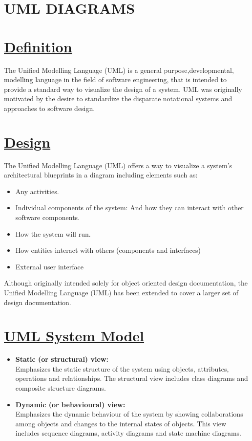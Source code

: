 \documentclass[12pt]{extreport}
\begin{document}
\section{UML DIAGRAMS}

\section*{\underline{Definition}}
\hspace*{5em}The Unified Modelling Language (UML) is a general purpose,developmental, modelling language in the field of software
engineering, that is intended to provide a standard way to visualize the design of a system. UML was originally motivated by the desire to standardize the disparate notational systems and approaches to software design.


\section*{\underline{Design}}
The Unified Modelling Language (UML) offers a way to visualize a system's architectural blueprints in a diagram  including elements such as:
\begin{itemize}


\item Any activities.
\item Individual components of the system:
And how they can interact with other software components.
\item How the system will run.
\item How entities interact with others (components and interfaces)
\item External user interface
\end{itemize}
\hspace*{5em}Although originally intended solely for object oriented design documentation, the Unified Modelling Language (UML) has been extended to cover a larger set of design documentation.


\section*{\underline{UML System Model}}
\begin{itemize}
\item \textbf{Static (or structural) view:}\\
Emphasizes the static structure of the system using objects, attributes,
operations and relationships. The structural view includes class diagrams and composite structure
diagrams.
\item \textbf{Dynamic (or behavioural) view:}\\
Emphasizes the dynamic behaviour of the system by showing collaborations among objects and changes to the internal states of objects. This view includes sequence diagrams, activity diagrams and state machine diagrams.
\end{itemize}
\end{document}
